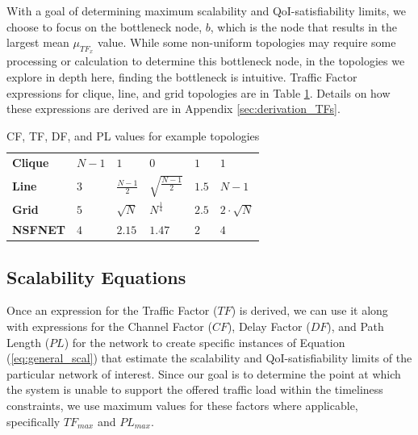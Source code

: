 With a goal of determining maximum scalability and QoI-satisfiability limits, we choose to focus on the bottleneck node, $b$, which is the node that results in the largest mean $\mu_{TF_x}$ value.  While some non-uniform topologies may require some processing or calculation to determine this bottleneck node, in the topologies we explore in depth here, finding the bottleneck is intuitive. Traffic Factor expressions for clique, line, and grid topologies are in Table \ref{table:rf_ff_sf_values}. Details on how these expressions are derived are in Appendix \ref{sec:derivation_TFs}.  

\begin{table}[]
\centering
\begin{tabular}{l|l|l|l|l|l|}
\cline{2-6}
                            					 & \boldmath{$CF$}  			& \boldmath{$\mu_{TF}$}   			& \boldmath{$\sigma_{TF}$}										& \boldmath{$DF$}			& \boldmath{$PL_{max}$}	\\ \hline
\multicolumn{1}{|l|}{\textbf{Clique}} 	& $N-1$ 						& $1$                            				& $0$                            												& $1$  						& $1$ 					\\ \hline
\multicolumn{1}{|l|}{\textbf{Line}}   	& $3$   							& $\frac{N-1}{2}$ 					& $\sqrt{\frac{N-1}{2}}$ 		& $1.5$						& $N-1$				\\ \hline
\multicolumn{1}{|l|}{\textbf{Grid}}   	& $5$   							& $\sqrt{N}$                       			&$N^{\frac{1}{4}}$							&  $2.5$					& $2 \cdot \sqrt{N}$   	\\ \hline
\multicolumn{1}{|l|}{\textbf{NSFNET}}  & $4$  & $2.15$  &$1.47$ &  $2$  & $4$  \\ \hline
\end{tabular}
\vspace{1mm}
\caption{CF, TF, DF, and PL values for example topologies}
\label{table:rf_ff_sf_values}
\end{table}

\subsection{Scalability Equations}

Once an expression for the Traffic Factor ($TF$) is derived, we can use it along with expressions for the Channel Factor ($CF$), Delay Factor ($DF$), and Path Length ($PL$) for the network to create specific instances of Equation (\ref{eq:general_scal}) that estimate the scalability and QoI-satisfiability limits of the particular network of interest.  Since our goal is to determine the point at which the system is unable to support the offered traffic load within the timeliness constraints, we use maximum values for these factors where applicable, specifically $TF_{max}$ and $PL_{max}$. 

